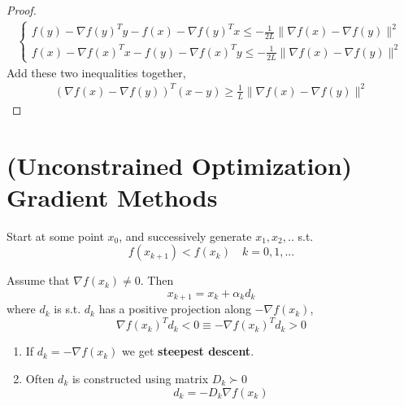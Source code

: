 \documentclass[11pt]{elegantbook}
\begin{document}
\begin{proof}
\begin{equation}
    \begin{aligned}
        \left\{\begin{matrix}
            f(y)-\nabla f(y)^Ty-f(x)-\nabla f(y)^Tx\leq -\frac{1}{2L}\|\nabla f(x)-\nabla f(y)\|^2\\
            f(x)-\nabla f(x)^Tx-f(y)-\nabla f(x)^Ty\leq -\frac{1}{2L}\|\nabla f(x)-\nabla f(y)\|^2
        \end{matrix}\right.
    \end{aligned}
    \nonumber
\end{equation}
Add these two inequalities together,
\begin{equation}
    \begin{aligned}
        (\nabla f(x)-\nabla f(y))^T(x-y)\geq \frac{1}{L}\|\nabla f(x)-\nabla f(y)\|^2
    \end{aligned}
    \nonumber
\end{equation}
\end{proof}















\chapter{(Unconstrained Optimization) Gradient Methods}
\begin{definition}
Start at some point $x_0$, and successively generate $x_1,x_2,..$ s.t. $$f(x_{k+1})<f(x_k)\quad k=0,1,...$$
\end{definition}

\begin{definition}
    Assume that $\nabla f(x_k)\neq 0$. Then
    $$x_{k+1}=x_k+\alpha_k d_k$$
    where $d_k$ is s.t. $d_k$ has a positive projection along $-\nabla f(x_k)$,
    $$\nabla f(x_k)^T d_k<0 \equiv -\nabla f(x_k)^T d_k>0$$
\end{definition}
\begin{enumerate}[$\bullet$]
    \item If $d_k=-\nabla f(x_k)$ we get \textbf{steepest descent}.
    \item Often $d_k$ is constructed using matrix $D_k \succ 0$ $$d_k=-D_k\nabla f(x_k)$$
\end{enumerate}
\end{document}
